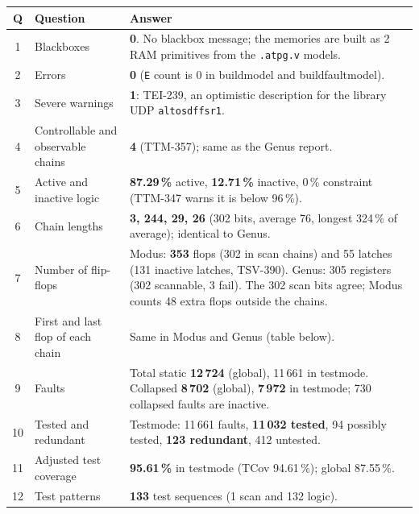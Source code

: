 \documentclass[11pt]{article}
\renewcommand{\_}{\oldus\hspace{0pt}}
\newcommand{\code}[1]{\texttt{\small #1}}
\begin{document}
\begin{center}\small
\begin{tabular}{@{}cp{5.4cm}p{7.4cm}@{}}
\toprule
\textbf{Q} & \textbf{Question} & \textbf{Answer} \\ \midrule
1 & Blackboxes & \textbf{0}. No blackbox message; the memories are built as 2 RAM primitives from the \code{.atpg.v} models. \\
2 & Errors & \textbf{0} (\code{*E} count is 0 in build\_model and build\_faultmodel). \\
3 & Severe warnings & \textbf{1}: TEI-239, an optimistic description for the library UDP \code{altos\_dff\_sr\_1}. \\
4 & Controllable and observable chains & \textbf{4} (TTM-357); same as the Genus report. \\
5 & Active and inactive logic & \textbf{87.29\,\%} active, \textbf{12.71\,\%} inactive, 0\,\% constraint (TTM-347 warns it is below 96\,\%). \\
6 & Chain lengths & \textbf{3, 244, 29, 26} (302 bits, average 76, longest 324\,\% of average); identical to Genus. \\
7 & Number of flip-flops & Modus: \textbf{353} flops (302 in scan chains) and 55 latches (131 inactive latches, TSV-390). Genus: 305 registers (302 scannable, 3 fail). The 302 scan bits agree; Modus counts 48 extra flops outside the chains. \\
8 & First and last flop of each chain & Same in Modus and Genus (table below). \\
9 & Faults & Total static \textbf{12\,724} (global), 11\,661 in testmode. Collapsed \textbf{8\,702} (global), \textbf{7\,972} in testmode; 730 collapsed faults are inactive. \\
10 & Tested and redundant & Testmode: 11\,661 faults, \textbf{11\,032 tested}, 94 possibly tested, \textbf{123 redundant}, 412 untested. \\
11 & Adjusted test coverage & \textbf{95.61\,\%} in testmode (TCov 94.61\,\%); global 87.55\,\%. \\
12 & Test patterns & \textbf{133} test sequences (1 scan and 132 logic). \\
\bottomrule
\end{tabular}
\end{center}
\end{document}
